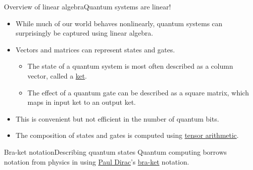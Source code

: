 \begin{frame}{Overview of linear algebra}{Quantum systems are linear!}
\begin{itemize}
    \item While much of our world behaves nonlinearly, quantum systems can surprisingly be captured using linear algebra.
    \item Vectors and matrices can represent states and gates.  
    \begin{itemize}
        \item The state of a quantum system is most often described as a column vector, called a \href{https://en.wikipedia.org/wiki/Bra-ket_notation}{ket}.
         \item The effect of a quantum gate can be described as a square matrix, which maps in input ket to an output ket.
    \end{itemize}
    \item This is convenient but not efficient in the number of quantum bits.
    \item The composition of states and gates is computed using \href{https://en.wikipedia.org/wiki/Tensor}{tensor arithmetic}.
\end{itemize}
    
\end{frame}

\begin{frame}{Bra-ket notation}{Describing quantum states}
Quantum computing borrows notation from physics in using \href{https://en.wikipedia.org/wiki/Paul_Dirac}{Paul Dirac}'s \href{https://en.wikipedia.org/wiki/Bra-ket_notation}{bra-ket} notation.
\end{frame}

